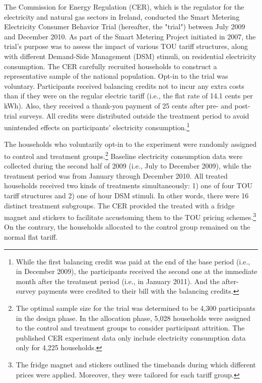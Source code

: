 The Commission for Energy Regulation (CER), which is the regulator for the electricity and natural gas sectors in Ireland, conducted the Smart Metering Electricity Consumer Behavior Trial (hereafter, the "trial") between July 2009 and December 2010. As part of the Smart Metering Project initiated in 2007, the trial's purpose was to assess the impact of various TOU tariff structures, along with different Demand-Side Management (DSM) stimuli, on residential electricity consumption. The CER carefully recruited households to construct a representative sample of the national population. Opt-in to the trial was voluntary. Participants received balancing credits not to incur any extra costs than if they were on the regular electric tariff (i.e., the flat rate of 14.1 cents per kWh). Also, they received a thank-you payment of 25 cents after pre- and post-trial surveys. All credits were distributed outside the treatment period to avoid unintended effects on participants' electricity consumption.\footnote{While the first balancing credit was paid at the end of the base period (i.e., in December 2009), the participants received the second one at the immediate month after the treatment period (i.e., in January 2011). And the after-survey payments were credited to their bill with the balancing credits.}

The households who voluntarily opt-in to the experiment were randomly assigned to control and treatment groups.\footnote{The optimal sample size for the trial was determined to be 4,300 participants in the design phase. In the allocation phase, 5,028 households were assigned to the control and treatment groups to consider participant attrition. The published CER experiment data only include electricity consumption data only for 4,225 households.} Baseline electricity consumption data were collected during the second half of 2009 (i.e., July to December 2009), while the treatment period was from January through December 2010. All treated households received two kinds of treatments simultaneously: 1) one of four TOU tariff structures and 2) one of hour DSM stimuli. In other words, there were 16 distinct treatment subgroups. The CER provided the treated with a fridge magnet and stickers to facilitate accustoming them to the TOU pricing schemes.\footnote{The fridge magnet and stickers outlined the timebands during which different prices were applied. Moreover, they were tailored for each tariff group.} On the contrary, the households allocated to the control group remained on the normal flat tariff.

